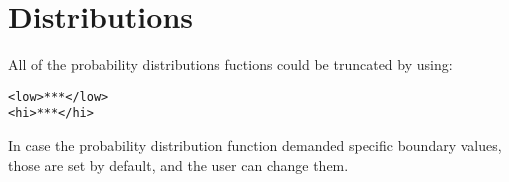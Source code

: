 \section{Distributions\\ \vspace{2em}}

\newcommand{\distname}[1]{\textbf{#1}}

\newcommand{\distattrib}[1]{\textit{#1}}


All of the probability distributions fuctions could be truncated by using: 
\begin{lstlisting}[style=XML]
<low>***</low>
<hi>***</hi>
\end{lstlisting}
In case the probability distribution function demanded specific boundary values, those are set by default, and the user can change them.

